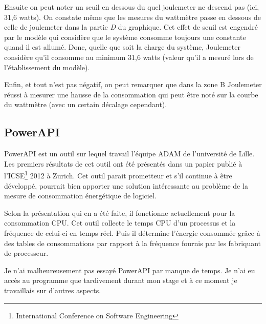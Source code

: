 \documentclass[a4paper, 11pt]{report}
\begin{document}
Ensuite on peut noter un seuil en dessous du quel joulemeter ne descend pas (ici, 31,6 watts). On constate même que les mesures du wattmètre passe en dessous de celle de joulemeter dans la partie \textit{D} du graphique. Cet effet de seuil est engendré par le modèle qui considère que le système consomme toujours une constante quand il est allumé. Donc, quelle que soit la charge du système, Joulemeter considère qu'il consomme au minimum 31,6 watts (valeur qu'il a mesuré lors de l'établissement du modèle).

Enfin, et tout n'est pas négatif, on peut remarquer que dans la zone B Joulemeter réussi à mesurer une hausse de la consommation qui peut être noté sur la courbe du wattmètre (avec un certain décalage cependant).

\subsection{PowerAPI}
PowerAPI est un outil sur lequel travail l'équipe ADAM de l'université de Lille. Les premiers résultats de cet outil ont été présentés dans un papier\cite{noureddine:hal-00681560} publié à l'ICSE\footnote{International Conference on Software Engineering} 2012 à Zurich. Cet outil parait prometteur et s'il continue à être développé, pourrait bien apporter une solution intéressante au problème de la mesure de consommation énergétique de logiciel.

Selon la présentation qui en a été faite, il fonctionne actuellement pour la consommation CPU. Cet outil collecte le temps CPU d'un processus et la fréquence de celui-ci en temps réel. Puis il détermine l'énergie consommée grâce à des tables de consommations par rapport à la fréquence fournis par les fabriquant de processeur.

Je n'ai malheureusement pas essayé PowerAPI par manque de temps. Je n'ai eu accès au programme que tardivement durant mon stage et à ce moment je travaillais sur d'autres aspects.
\end{document}
